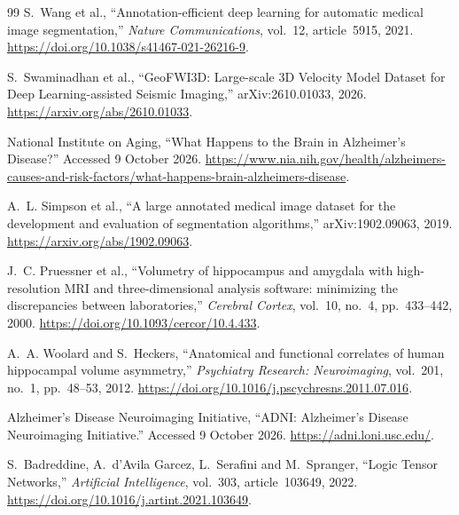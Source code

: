 \documentclass[12pt,a4paper]{article}
\begin{document}
\renewcommand{\refname}{Bibliography}
{}
\begin{thebibliography}{99}
S.~Wang et al., ``Annotation-efficient deep learning for automatic medical
image segmentation,'' \emph{Nature Communications}, vol.~12, article~5915,
2021. \url{https://doi.org/10.1038/s41467-021-26216-9}.

S.~Swaminadhan et al., ``GeoFWI3D: Large-scale 3D Velocity Model Dataset for
Deep Learning-assisted Seismic Imaging,'' arXiv:2610.01033, 2026.
\url{https://arxiv.org/abs/2610.01033}.

National Institute on Aging, ``What Happens to the Brain in Alzheimer's
Disease?'' Accessed 9 October 2026.
\url{https://www.nia.nih.gov/health/alzheimers-causes-and-risk-factors/what-happens-brain-alzheimers-disease}.

A.~L. Simpson et al., ``A large annotated medical image dataset for the
development and evaluation of segmentation algorithms,'' arXiv:1902.09063,
2019. \url{https://arxiv.org/abs/1902.09063}.

J.~C. Pruessner et al., ``Volumetry of hippocampus and amygdala with
high-resolution MRI and three-dimensional analysis software: minimizing
the discrepancies between laboratories,'' \emph{Cerebral Cortex},
vol.~10, no.~4, pp.~433--442, 2000.
\url{https://doi.org/10.1093/cercor/10.4.433}.

A.~A. Woolard and S.~Heckers, ``Anatomical and functional correlates of
human hippocampal volume asymmetry,'' \emph{Psychiatry Research:
Neuroimaging}, vol.~201, no.~1, pp.~48--53, 2012.
\url{https://doi.org/10.1016/j.pscychresns.2011.07.016}.

Alzheimer's Disease Neuroimaging Initiative, ``ADNI: Alzheimer's Disease
Neuroimaging Initiative.'' Accessed 9 October 2026.
\url{https://adni.loni.usc.edu/}.

S.~Badreddine, A.~d'Avila Garcez, L.~Serafini and M.~Spranger,
``Logic Tensor Networks,'' \emph{Artificial Intelligence}, vol.~303,
article~103649, 2022.
\url{https://doi.org/10.1016/j.artint.2021.103649}.


\end{thebibliography}
\end{document}
